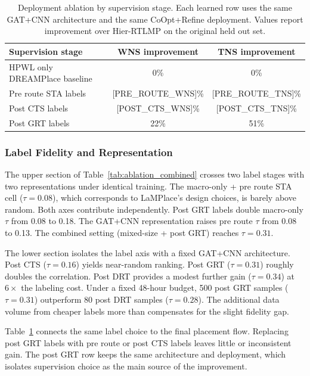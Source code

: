\documentclass[sigconf,anonymous,review,9pt]{acmart}
\begin{document}
\begin{table}[t]
\centering
\caption{Deployment ablation by supervision stage. Each learned row uses the same GAT+CNN architecture and the same CoOpt{+}Refine deployment. Values report improvement over Hier-RTLMP on the original held out set.}
\label{tab:supervision_deploy}
\renewcommand{\arraystretch}{1.12}
\footnotesize
\begin{tabular}{@{}lcc@{}}
\toprule
Supervision stage & WNS improvement & TNS improvement \\
\midrule
HPWL only DREAMPlace baseline & 0\% & 0\% \\
Pre route STA labels & [PRE_ROUTE_WNS]\% & [PRE_ROUTE_TNS]\% \\
Post CTS labels & [POST_CTS_WNS]\% & [POST_CTS_TNS]\% \\
Post GRT labels & 22\% & 51\% \\
\bottomrule
\end{tabular}
\renewcommand{\arraystretch}{1.0}
\end{table}

\subsubsection{Label Fidelity and Representation}
\label{subsec:2x2}

The upper section of Table~\ref{tab:ablation_combined} crosses two
label stages with two representations under identical training. The macro-only + pre route STA cell ($\tau = 0.08$), which
corresponds to LaMPlace's design choices, is barely above random. Both axes contribute
independently. Post GRT labels double macro-only $\tau$ from 0.08 to
0.18. The GAT+CNN representation raises pre route $\tau$ from 0.08 to
0.13. The combined setting (mixed-size + post GRT) reaches
$\tau = 0.31$.

The lower section isolates the label axis with a fixed GAT+CNN
architecture. Post CTS ($\tau = 0.16$) yields near-random ranking.
Post GRT ($\tau = 0.31$) roughly doubles the correlation. Post DRT
provides a modest further gain ($\tau = 0.34$) at $6\times$ the
labeling cost. Under a fixed 48-hour budget, 500 post GRT samples
($\tau = 0.31$) outperform 80 post DRT samples ($\tau = 0.28$). The
additional data volume from cheaper labels more than compensates for
the slight fidelity gap.

Table~\ref{tab:supervision_deploy} connects the same label choice to
the final placement flow. Replacing post GRT labels with pre route or
post CTS labels leaves little or inconsistent gain. The post GRT row
keeps the same architecture and deployment, which isolates supervision
choice as the main source of the improvement.
\end{document}
